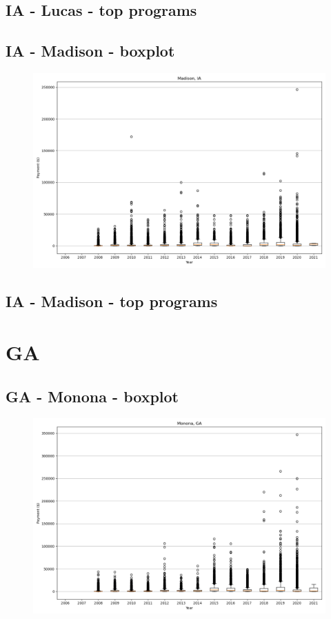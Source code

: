 \subsection*{IA - Lucas - top programs}

\newpage
\subsection*{IA - Madison - boxplot}
\begin{figure}[h]
\centering
\includegraphics[width=7in]{../output/boxplots/counties/Madison-IA_boxplot.png}
\end{figure}


\subsection*{IA - Madison - top programs}

\newpage
\section*{GA}
\subsection*{GA - Monona - boxplot}
\begin{figure}[h]
\centering
\includegraphics[width=7in]{../output/boxplots/counties/Monona-GA_boxplot.png}
\end{figure}


